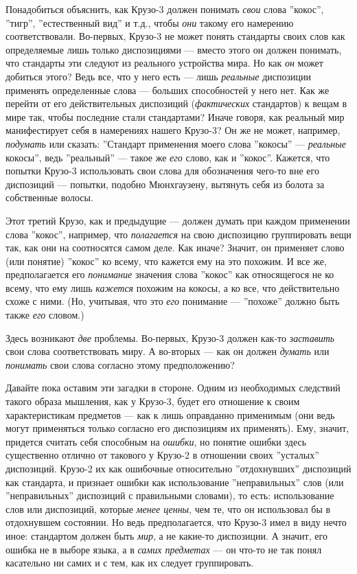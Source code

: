 \documentclass[11pt]{book}
\begin{document}
Понадобиться объяснить, как Крузо-3 должен понимать \textit{свои} слова ''кокос'', ''тигр'', ''естественный вид'' и т.д., чтобы \textit{они} такому его намерению соответствовали. Во-первых, Крузо-3 не может понять стандарты своих слов как определяемые лишь только диспозициями --- вместо этого он должен понимать, что стандарты эти следуют из реального устройства мира. Но как \textit{он} может добиться этого? Ведь все, что у него есть --- лишь \textit{реальные} диспозиции применять определенные слова --- больших способностей у него нет. Как же перейти от его действительных диспозиций (\textit{фактических} стандартов) к вещам в мире так, чтобы последние стали стандартами? Иначе говоря, как реальный мир манифестирует себя в намерениях нашего Крузо-3? Он же не может, например, \textit{подумать} или сказать: ''Стандарт применения моего слова ''кокосы'' --- \textit{реальные} кокосы'', ведь ''реальный'' --- такое же \textit{его} слово, как и ''кокос''. Кажется, что попытки Крузо-3 использовать свои слова для обозначения чего-то вне его диспозиций --- попытки, подобно Мюнхгаузену, вытянуть себя из болота за собственные волосы.

Этот третий Крузо, как и предыдущие --- должен думать при каждом применении слова ''кокос'', например, что \textit{полагается} на свою диспозицию группировать вещи так, как они на соотносятся самом деле. Как иначе? Значит, он применяет слово (или понятие) ''кокос'' ко всему, что кажется ему на это похожим. И все же, предполагается его \textit{понимание} значения слова ''кокос'' как относящегося не ко всему, что ему лишь \textit{кажется} похожим на кокосы, а ко все, что действительно схоже с ними. (Но, учитывая, что это \textit{его} понимание --- ''похоже'' должно быть также \textit{его} словом.)

Здесь возникают \textit{две} проблемы. Во-первых, Крузо-3 должен как-то \textit{заставить} свои слова соответствовать миру. А во-вторых --- как он должен \textit{думать} или \textit{понимать} свои слова согласно этому предположению?

Давайте пока оставим эти загадки в стороне. Одним из необходимых следствий такого образа мышления, как у Крузо-3, будет его отношение к своим характеристикам предметов --- как к лишь оправданно применимым (они ведь могут применяться только согласно его диспозициям их применять). Ему, значит, придется считать себя способным на \textit{ошибки}, но понятие ошибки здесь существенно отлично от такового у Крузо-2 в отношении своих ''усталых'' диспозиций. Крузо-2 их как ошибочные относительно ''отдохнувших'' диспозиций как стандарта, и признает ошибки как использование ''неправильных'' слов (или ''неправильных'' диспозиций с правильными словами), то есть: использование слов или диспозиций, которые \textit{менее ценны}, чем те, что он использовал бы в отдохнувшем состоянии. Но ведь предполагается, что Крузо-3 имел в виду нечто иное: стандартом должен быть \textit{мир}, а не какие-то диспозиции. А значит, его ошибка не в выборе языка, а в \textit{самих предметах} --- он что-то не так понял касательно ни самих и с тем, как их следует группировать.
\end{document}
